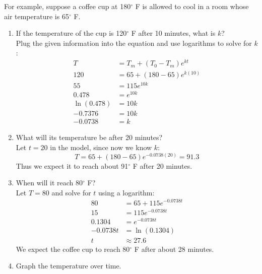 For example, suppose a coffee cup at 180$^{\circ}$ F is allowed to cool in a room whose air temperature is 65$^{\circ}$ F.
\begin{enumerate}
\item If the temperature of the cup is 120$^{\circ}$ F after 10 minutes, what is $k$?\\

Plug the given information into the equation and use logarithms to solve for $k$:
\begin{align*}
T &= T_m+(T_0-T_m)e^{kt}\\
120 &= 65 + (180-65)e^{k(10)}\\
55 &= 115e^{10k}\\
0.478 &= e^{10k}\\
\ln(0.478) &= 10k\\
-0.7376 &= 10k\\
-0.0738 &= k
\end{align*}

\item What will its temperature be after 20 minutes?\\

Let $t=20$ in the model, since now we know $k$:
\[T=65+(180-65)e^{-0.0738(20)} = 91.3\]
Thus we expect it to reach about 91$^{\circ}$ F after 20 minutes.

\item When will it reach 80$^{\circ}$ F?\\

Let $T=80$ and solve for $t$ using a logarithm:
\begin{align*}
80 &= 65+115e^{-0.0738t}\\
15 &= 115e^{-0.0738t}\\
0.1304 &= e^{-0.0738t}\\ 
-0.0738t &= \ln(0.1304)\\ 
t &\approx 27.6
\end{align*}
We expect the coffee cup to reach 80$^{\circ}$ F after about 28 minutes.
\pagebreak

\item Graph the temperature over time.
\begin{center}
\end{center}


\end{enumerate}
